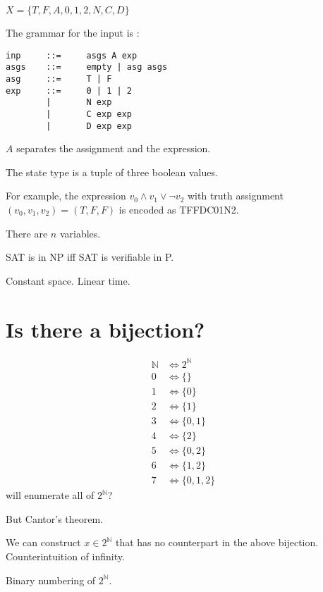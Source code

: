$X = \{ T, F, A, 0, 1, 2, N, C, D \}$

The grammar for the input is \verb@inp@:
\begin{verbatim}
inp     ::=     asgs A exp
asgs    ::=     empty | asg asgs
asg     ::=     T | F
exp     ::=     0 | 1 | 2
        |       N exp
        |       C exp exp
        |       D exp exp
\end{verbatim}

$A$ separates the assignment and the expression.

The state type is a tuple of three boolean values.

For example, the expression $v_0 \wedge v_1 \vee \neg v_2$ with truth assignment $(v_0,v_1,v_2) = (T,F,F)$ is encoded as TFFDC01N2.

There are $n$ variables.

SAT is in NP iff SAT is verifiable in P.

Constant space. Linear time.

\section{Is there a bijection?}

\begin{align}
    \mathbb N &\iff 2^\mathbb N
    \\ 0 &\iff \{\}
    \\ 1 &\iff \{0\}
    \\ 2 &\iff \{1\}
    \\ 3 &\iff \{0,1\}
    \\ 4 &\iff \{2\}
    \\ 5 &\iff \{0,2\}
    \\ 6 &\iff \{1,2\}
    \\ 7 &\iff \{0,1,2\}
\end{align}
will enumerate all of $2^\mathbb N$?

But Cantor's theorem.

We can construct $x \in 2^\mathbb N$ that has no counterpart in the above bijection.
Counterintuition of infinity.

Binary numbering of $2^\mathbb N$.
